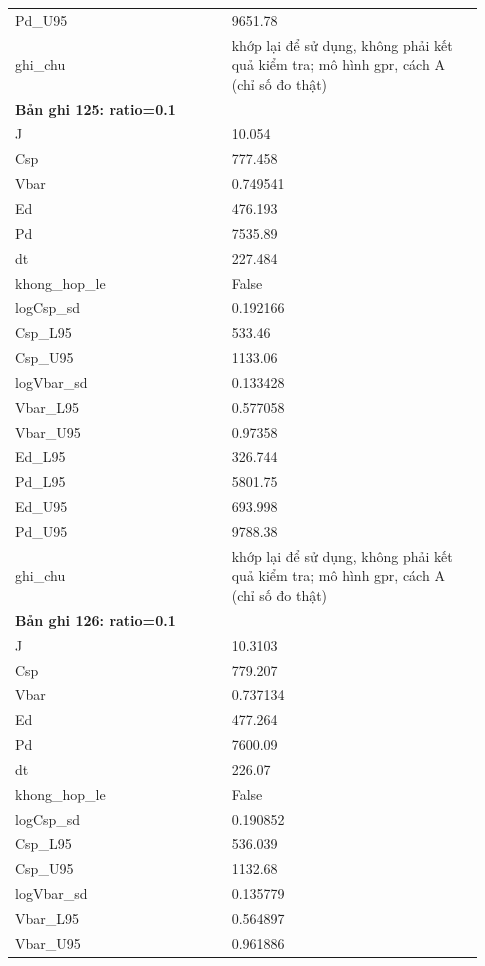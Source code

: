 \begin{longtable}{p{0.43\linewidth}p{0.50\linewidth}}
Pd\_\allowbreak U95 & 9651.78 \\
ghi\_\allowbreak chu & khớp lại để sử dụng, không phải kết quả kiểm tra; mô hình gpr, cách A (chỉ số đo thật) \\
\midrule
\multicolumn{2}{p{0.95\linewidth}}{\textbf{Bản ghi 125: ratio=0.1}} \\
J & 10.054 \\
Csp & 777.458 \\
Vbar & 0.749541 \\
Ed & 476.193 \\
Pd & 7535.89 \\
dt & 227.484 \\
khong\_\allowbreak hop\_\allowbreak le & False \\
logCsp\_\allowbreak sd & 0.192166 \\
Csp\_\allowbreak L95 & 533.46 \\
Csp\_\allowbreak U95 & 1133.06 \\
logVbar\_\allowbreak sd & 0.133428 \\
Vbar\_\allowbreak L95 & 0.577058 \\
Vbar\_\allowbreak U95 & 0.97358 \\
Ed\_\allowbreak L95 & 326.744 \\
Pd\_\allowbreak L95 & 5801.75 \\
Ed\_\allowbreak U95 & 693.998 \\
Pd\_\allowbreak U95 & 9788.38 \\
ghi\_\allowbreak chu & khớp lại để sử dụng, không phải kết quả kiểm tra; mô hình gpr, cách A (chỉ số đo thật) \\
\midrule
\multicolumn{2}{p{0.95\linewidth}}{\textbf{Bản ghi 126: ratio=0.1}} \\
J & 10.3103 \\
Csp & 779.207 \\
Vbar & 0.737134 \\
Ed & 477.264 \\
Pd & 7600.09 \\
dt & 226.07 \\
khong\_\allowbreak hop\_\allowbreak le & False \\
logCsp\_\allowbreak sd & 0.190852 \\
Csp\_\allowbreak L95 & 536.039 \\
Csp\_\allowbreak U95 & 1132.68 \\
logVbar\_\allowbreak sd & 0.135779 \\
Vbar\_\allowbreak L95 & 0.564897 \\
Vbar\_\allowbreak U95 & 0.961886 \\

\end{longtable}
